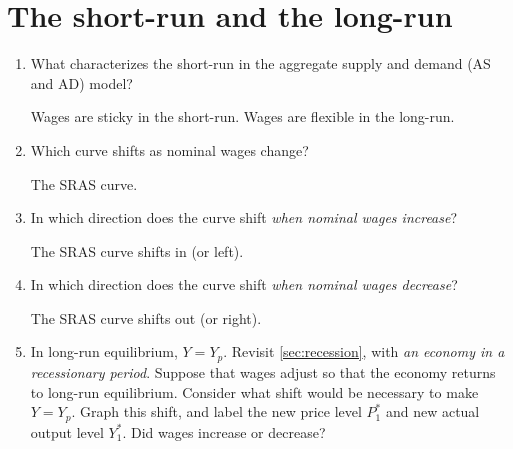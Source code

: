 \documentclass{assignment}
\begin{document}
\section{The short-run and the long-run}

\begin{enumerate}

\item What characterizes the short-run in the aggregate supply and demand (AS and AD) model?

\begin{solution}
Wages are sticky in the short-run. Wages are flexible in the long-run.
\end{solution}

\item Which curve shifts as nominal wages change?

\begin{solution}
The SRAS curve.
\end{solution}

\item In which direction does the curve shift \emph{when nominal wages increase}?

\begin{solution}
The SRAS curve shifts in (or left).
\end{solution}

\item In which direction does the curve shift \emph{when nominal wages decrease}?

\begin{solution}
The SRAS curve shifts out (or right).
\end{solution}

\item In long-run equilibrium, $Y=Y_p$. Revisit \cref{sec:recession}, with \emph{an economy in a recessionary period}. Suppose that wages adjust so that the economy returns to long-run equilibrium. Consider what shift would be necessary to make $Y=Y_p$. Graph this shift, and label the new price level $P^*_1$ and new actual output level $Y^*_1$. Did wages increase or decrease?

\begin{solution}


\end{solution}
\end{enumerate}
\end{document}
